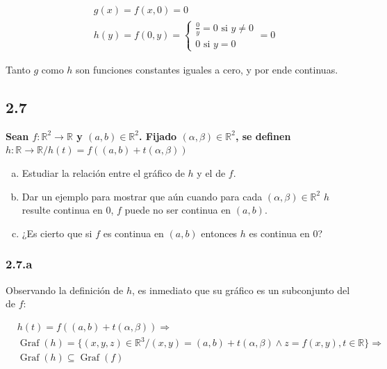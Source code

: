 \documentclass{article}
\renewcommand{\Bbb}{\mathbb}
\begin{document}
\begin{align}
& g(x) = f(x,0) = 0 \\
& h(y) = f(0,y) = \left\{ \begin{array}{ll}
\frac{0}{y} = 0 \text{ si } y \neq 0 \\
0 \text{ si } y = 0
\end{array} \right. = 0
\end{align}

Tanto $g$ como $h$ son funciones constantes iguales a cero, y por ende continuas.

\subsection*{2.7}
\label{subsec:2.7}

\textbf{Sean $f: \Bbb R^2 \rightarrow \Bbb R$ y $(a, b) \in \Bbb R^2$. Fijado $(\alpha, \beta) \in \Bbb R^2$, se definen $h:\Bbb R \rightarrow \Bbb R / h(t) = f((a,b) + t(\alpha, \beta))$}

\begin{enumerate}[(a)]
\bfseries

\item Estudiar la relación entre el gráfico de $h$ y el de $f$.

\item Dar un ejemplo para mostrar que aún cuando para cada $(\alpha, \beta) \in \Bbb R^2$ $h$ resulte continua en 0, $f$ puede no ser continua en $(a,b)$.

\item ¿Es cierto que si $f$ es continua en $(a,b)$ entonces $h$ es continua en 0?

\end{enumerate}

\subsubsection*{2.7.a}
\label{subsubsec:2.7.a}

Observando la definición de $h$, es inmediato que su gráfico es un subconjunto del de $f$:

\begin{subequations}
\begin{align}
& h(t) = f((a,b) + t(\alpha, \beta)) \Rightarrow \\
& \mathop{Graf}(h) = \{ (x,y,z) \in \Bbb R^3 / (x,y) = (a,b) + t(\alpha, \beta) \wedge z = f(x,y), t \in \Bbb R \} \Rightarrow \\
& \mathop{Graf}(h) \subseteq \mathop{Graf}(f)
\end{align}
\end{subequations}
\end{document}
